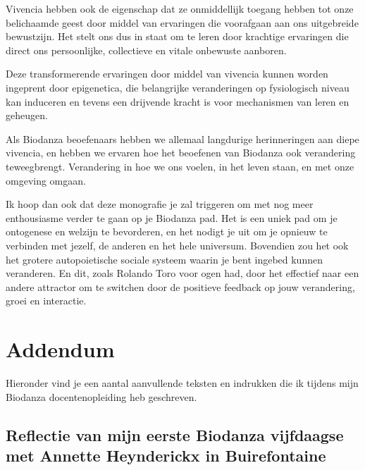\documentclass[
  11pt,
]{book}
\begin{document}
Vivencia hebben ook de eigenschap dat ze onmiddellijk toegang hebben tot onze belichaamde geest door middel van ervaringen die voorafgaan aan ons uitgebreide bewustzijn. Het stelt ons dus in staat om te leren door krachtige ervaringen die direct ons persoonlijke, collectieve en vitale onbewuste aanboren.

Deze transformerende ervaringen door middel van vivencia kunnen worden ingeprent door epigenetica, die belangrijke veranderingen op fysiologisch niveau kan induceren en tevens een drijvende kracht is voor mechanismen van leren en geheugen.

Als Biodanza beoefenaars hebben we allemaal langdurige herinneringen aan diepe vivencia, en hebben we ervaren hoe het beoefenen van Biodanza ook verandering teweegbrengt. Verandering in hoe we ons voelen, in het leven staan, en met onze omgeving omgaan.

Ik hoop dan ook dat deze monografie je zal triggeren om met nog meer enthousiasme verder te gaan op je Biodanza pad. Het is een uniek pad om je ontogenese en welzijn te bevorderen, en het nodigt je uit om je opnieuw te verbinden met jezelf, de anderen en het hele universum. Bovendien zou het ook het grotere autopoietische sociale systeem waarin je bent ingebed kunnen veranderen. En dit, zoals Rolando Toro voor ogen had, door het effectief naar een andere attractor om te switchen door de positieve feedback op jouw verandering, groei en interactie.

\hypertarget{addendum}{%
\chapter*{Addendum}\label{addendum}}

Hieronder vind je een aantal aanvullende teksten en indrukken die ik tijdens mijn Biodanza docentenopleiding heb geschreven.

\hypertarget{reflectie-van-mijn-eerste-biodanza-vijfdaagse-met-annette-heynderickx-in-buirefontaine}{%
\section*{Reflectie van mijn eerste Biodanza vijfdaagse met Annette Heynderickx in Buirefontaine}\label{reflectie-van-mijn-eerste-biodanza-vijfdaagse-met-annette-heynderickx-in-buirefontaine}}
\end{document}
